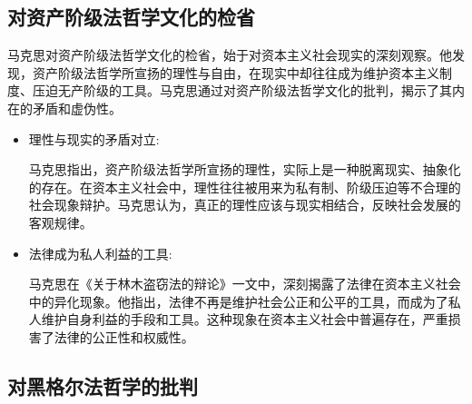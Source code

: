 \subsection{对资产阶级法哲学文化的检省}

马克思对资产阶级法哲学文化的检省，始于对资本主义社会现实的深刻观察。他发现，资产阶级法哲学所宣扬的理性与自由，在现实中却往往成为维护资本主义制度、压迫无产阶级的工具。马克思通过对资产阶级法哲学文化的批判，揭示了其内在的矛盾和虚伪性。
\begin{itemize}
    \item {\heiti 理性与现实的矛盾对立:}
    
    \qquad 马克思指出，资产阶级法哲学所宣扬的理性，实际上是一种脱离现实、抽象化的存在。在资本主义社会中，理性往往被用来为私有制、阶级压迫等不合理的社会现象辩护。马克思认为，真正的理性应该与现实相结合，反映社会发展的客观规律。

     \item {\heiti 法律成为私人利益的工具:}
    
    \qquad 马克思在《关于林木盗窃法的辩论》一文中，深刻揭露了法律在资本主义社会中的异化现象。他指出，法律不再是维护社会公正和公平的工具，而成为了私人维护自身利益的手段和工具。这种现象在资本主义社会中普遍存在，严重损害了法律的公正性和权威性。

  
\end{itemize}



\subsection{对黑格尔法哲学的批判}

